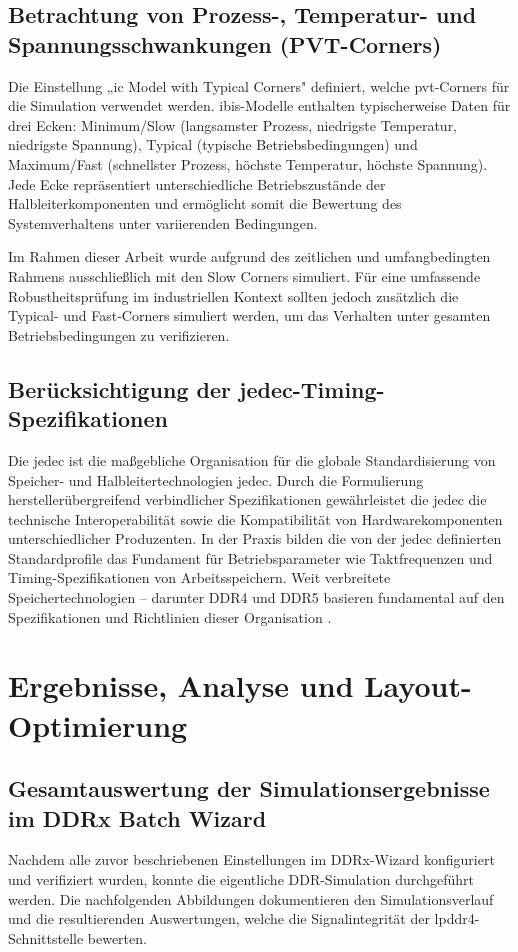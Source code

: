 \section{Betrachtung von Prozess-, Temperatur- und Spannungsschwankungen (PVT-Corners)}
Die Einstellung „\gls{ic} Model with Typical Corners" definiert, welche \gls{pvt}-Corners für die Simulation verwendet werden. \gls{ibis}-Modelle enthalten typischerweise Daten für drei Ecken: Minimum/Slow (langsamster Prozess, niedrigste Temperatur, niedrigste Spannung), Typical (typische Betriebsbedingungen) und Maximum/Fast (schnellster Prozess, höchste Temperatur, höchste Spannung). Jede Ecke repräsentiert unterschiedliche Betriebszustände der Halbleiterkomponenten und ermöglicht somit die Bewertung des Systemverhaltens unter variierenden Bedingungen.

Im Rahmen dieser Arbeit wurde aufgrund des zeitlichen und umfangbedingten Rahmens ausschließlich mit den Slow Corners simuliert. Für eine umfassende Robustheitsprüfung im industriellen Kontext sollten jedoch zusätzlich die Typical- und Fast-Corners simuliert werden, um das Verhalten unter gesamten Betriebsbedingungen zu verifizieren.

\section{Berücksichtigung der \gls{jedec}-Timing-Spezifikationen}
Die \gls{jedec} ist die maßgebliche Organisation für die globale Standardisierung von Speicher- und Halbleitertechnologien \gls{jedec}. Durch die Formulierung herstellerübergreifend verbindlicher Spezifikationen gewährleistet die \gls{jedec} die technische Interoperabilität sowie die Kompatibilität von Hardwarekomponenten unterschiedlicher Produzenten. In der Praxis bilden die von der \gls{jedec} definierten Standardprofile das Fundament für Betriebsparameter wie Taktfrequenzen und Timing-Spezifikationen von Arbeitsspeichern. Weit verbreitete Speichertechnologien – darunter DDR4 und DDR5 basieren fundamental auf den Spezifikationen und Richtlinien dieser Organisation \cite{pcbstore_jedec}.

\chapter{Ergebnisse, Analyse und Layout-Optimierung}
\section{Gesamtauswertung der Simulationsergebnisse im DDRx Batch Wizard}
Nachdem alle zuvor beschriebenen Einstellungen im DDRx-Wizard konfiguriert und verifiziert wurden, konnte die eigentliche DDR-Simulation durchgeführt werden. Die nachfolgenden Abbildungen dokumentieren den Simulationsverlauf und die resultierenden Auswertungen, welche die Signalintegrität der \gls{lpddr4}-Schnittstelle bewerten.

